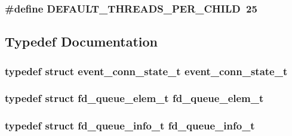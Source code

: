 \subsubsection[{\texorpdfstring{D\+E\+F\+A\+U\+L\+T\+\_\+\+T\+H\+R\+E\+A\+D\+S\+\_\+\+P\+E\+R\+\_\+\+C\+H\+I\+LD}{DEFAULT_THREADS_PER_CHILD}}]{\setlength{\rightskip}{0pt plus 5cm}\#define D\+E\+F\+A\+U\+L\+T\+\_\+\+T\+H\+R\+E\+A\+D\+S\+\_\+\+P\+E\+R\+\_\+\+C\+H\+I\+LD~25}\hypertarget{group__APACHE__MPM__EVENT_gaf3e2d0fe4c45aac538a61bf99d69a378}{}\label{group__APACHE__MPM__EVENT_gaf3e2d0fe4c45aac538a61bf99d69a378}


\subsection{Typedef Documentation}
\subsubsection[{\texorpdfstring{event\+\_\+conn\+\_\+state\+\_\+t}{event_conn_state_t}}]{\setlength{\rightskip}{0pt plus 5cm}typedef struct {\bf event\+\_\+conn\+\_\+state\+\_\+t} {\bf event\+\_\+conn\+\_\+state\+\_\+t}}\hypertarget{group__APACHE__MPM__EVENT_ga58fdee464d43137837b98e9009534343}{}\label{group__APACHE__MPM__EVENT_ga58fdee464d43137837b98e9009534343}
\subsubsection[{\texorpdfstring{fd\+\_\+queue\+\_\+elem\+\_\+t}{fd_queue_elem_t}}]{\setlength{\rightskip}{0pt plus 5cm}typedef struct {\bf fd\+\_\+queue\+\_\+elem\+\_\+t} {\bf fd\+\_\+queue\+\_\+elem\+\_\+t}}\hypertarget{group__APACHE__MPM__EVENT_ga05898396eb6f09bf84cdf03f6c4bea00}{}\label{group__APACHE__MPM__EVENT_ga05898396eb6f09bf84cdf03f6c4bea00}
\subsubsection[{\texorpdfstring{fd\+\_\+queue\+\_\+info\+\_\+t}{fd_queue_info_t}}]{\setlength{\rightskip}{0pt plus 5cm}typedef struct {\bf fd\+\_\+queue\+\_\+info\+\_\+t} {\bf fd\+\_\+queue\+\_\+info\+\_\+t}}\hypertarget{group__APACHE__MPM__EVENT_gae60bd20f632fdf018c59af8943651458}{}\label{group__APACHE__MPM__EVENT_gae60bd20f632fdf018c59af8943651458}
